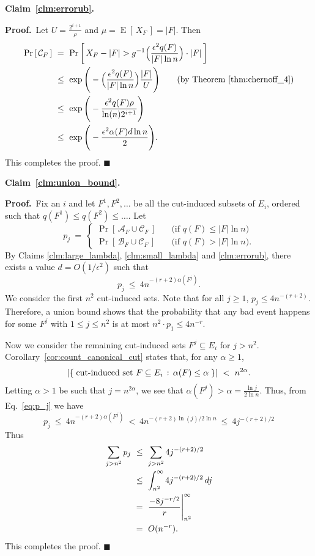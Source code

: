 \documentclass[11pt]{article}
\newcommand{\proofbelow}{8pt}
\numberwithin{equation}{section}
\renewenvironment{proof}{\noindent\textbf{Proof.}\,}{\afterproof}
\newcommand{\afterproof}{\hfill $\blacksquare$ \par \vspace{\proofbelow}}
\newcommand{\repeatclaim}[2]{\vspace{6pt}\noindent\textbf{#1. }{\it #2} \vspace{6pt}}
\newcommand{\cA}{\mathcal{A}}
\newcommand{\cB}{\mathcal{B}}
\newcommand{\cC}{\mathcal{C}}
\newcommand{\union}{\cup}
\newcommand{\abs}[1]{\lvert #1 \rvert}
\newcommand{\card}[1]{\abs{#1}}
\newcommand{\prob}[1]{\operatorname{Pr}\left[\,#1\,\right]}               \newcommand{\probg}[2]{\operatorname{Pr}\left[\,#1 \:\mid\: #2\,\right]}
\newcommand{\expect}[1]{\operatorname{E}\left[\,#1\,\right]}              \newcommand{\expectg}[2]{\operatorname{E}\left[\,#1 \,\mid\, #2\,\right]}
\newcommand{\Claim}[1]{Claim~\ref{clm:#1}}
\newcommand{\Corollary}[1]{Corollary~\ref{cor:#1}}
\newcommand{\EquationName}[1]{\label{eq:#1}}
\newcommand{\Equation}[1]{Eq.~\eqref{eq:#1}}
\begin{document}
\repeatclaim{\Claim{errorub}}{\clmerrorub}

\begin{proof}
Let $U = \frac{ 2^{i+1} }{ \rho }$ and $\mu = \expect{ X_F } = |F|$.
Then
\begin{align*}
\prob{ \cC_F }
 &~=~ \prob{ X_F - |F| > g^{-1}\Big( \frac{ \epsilon^2 q(F) }{ |F| \ln n } \Big) \cdot |F| } \\
 &~\le~ \exp\Bigg(-\Big(\frac{ \epsilon^2 q(F) }{ |F| \ln n }\Big) \frac{|F|}{U} \Bigg)
    \qquad\text{(by Theorem \ref{thm:chernoff_4})} \\
 &~\le~ \exp\Bigg(-\frac{ \epsilon^2 q(F) \rho }{ \ln(n) 2^{i+1} } \Bigg) \\
 &~\le~ \exp\Bigg(-\frac{ \epsilon^2 \alpha(F) d \ln n }{ 2 } \Bigg).
\end{align*}
This completes the proof.
\end{proof}


\repeatclaim{\Claim{union_bound}}{\clmunionbound}

\begin{proof}
Fix an $i$ and let $F^1, F^2, \ldots$ be all the cut-induced subsets of $E_i$,
ordered such that $q(F^1) \le q(F^2) \le \ldots$.
Let
$$
p_j ~=~
\begin{cases}
\prob{ \cA_F \union \cC_F } &\quad\text{(if $q(F) \leq |F| \ln n$)} \\
\prob{ \cB_F \union \cC_F } &\quad\text{(if $q(F) > |F| \ln n$)}.
\end{cases}
$$
By Claims \ref{clm:large_lambda}, \ref{clm:small_lambda} and \ref{clm:errorub},
there exists a value $d=O(1/\epsilon^2)$ such that 
\begin{equation}
\EquationName{p_j}
p_j ~\le~ 4n^{-(r+2)\alpha(F^j)}.
\end{equation}
We consider the first $n^2$ cut-induced sets.
Note that for all $j \ge 1$, $p_j \le 4n^{-(r+2)}$.
Therefore, a union bound shows that
the probability that any bad event happens for some $F^j$ with $1 \leq j \leq n^2$
is at most $n^2 \cdot p_1 \le 4n^{-r}$.

Now we consider the remaining cut-induced sets $F^j \subseteq E_i$ for $j > n^2$.
\Corollary{count_canonical_cut} states that, for any $\alpha \geq 1$,
$$
\card{ \setst{ \text{cut-induced set } F \subseteq E_i }{ \alpha(F) \leq \alpha } } ~<~ n^{2\alpha}.
$$
Letting $\alpha>1$ be such that $j = n^{2 \alpha}$,
we see that $\alpha(F^j) > \alpha = \frac{\ln j}{2 \ln n}$.
Thus, from \Equation{p_j} we have
$$
p_j
    ~\le~ 4n^{-(r+2)\alpha(F^j)}
    ~<~ 4n^{-(r+2) \ln(j)/2 \ln n }
    ~\le~ 4j^{-(r+2)/2}
$$
Thus 
\begin{align*}
\sum_{j>n^2} p_j
    &~\le~ \sum_{j>n^2} 4j^{-(r+2)/2} \\
    &~\le~ \int^\infty_{n^2} 4j^{-(r+2)/2}\, dj \\
    &~=~ \frac{-8 j^{-r/2}}{r} \Bigg{|}_{n^2}^\infty \\
    &~=~ O(n^{-r}).
\end{align*}
This completes the proof.
\end{proof}
\end{document}
